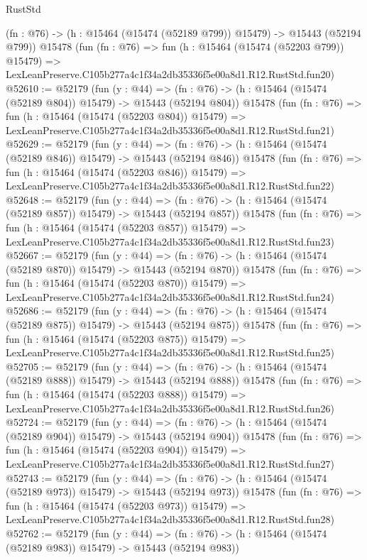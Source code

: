 \begin{lexlean}{RustStd}
\begin{coremodule}
    (fn : @76) -> (h : @15464 (@15474 (@52189 @799)) @15479) -> @15443 (@52194 @799))
    @15478
    (fun (fn : @76) =>
    fun (h : @15464 (@15474 (@52203 @799)) @15479) =>
    LexLeanPreserve.C105b277a4c1f34a2db35336f5e00a8d1.R12.RustStd.fun20)
@52610 := @52179
    (fun (y : @44) =>
    (fn : @76) -> (h : @15464 (@15474 (@52189 @804)) @15479) -> @15443 (@52194 @804))
    @15478
    (fun (fn : @76) =>
    fun (h : @15464 (@15474 (@52203 @804)) @15479) =>
    LexLeanPreserve.C105b277a4c1f34a2db35336f5e00a8d1.R12.RustStd.fun21)
@52629 := @52179
    (fun (y : @44) =>
    (fn : @76) -> (h : @15464 (@15474 (@52189 @846)) @15479) -> @15443 (@52194 @846))
    @15478
    (fun (fn : @76) =>
    fun (h : @15464 (@15474 (@52203 @846)) @15479) =>
    LexLeanPreserve.C105b277a4c1f34a2db35336f5e00a8d1.R12.RustStd.fun22)
@52648 := @52179
    (fun (y : @44) =>
    (fn : @76) -> (h : @15464 (@15474 (@52189 @857)) @15479) -> @15443 (@52194 @857))
    @15478
    (fun (fn : @76) =>
    fun (h : @15464 (@15474 (@52203 @857)) @15479) =>
    LexLeanPreserve.C105b277a4c1f34a2db35336f5e00a8d1.R12.RustStd.fun23)
@52667 := @52179
    (fun (y : @44) =>
    (fn : @76) -> (h : @15464 (@15474 (@52189 @870)) @15479) -> @15443 (@52194 @870))
    @15478
    (fun (fn : @76) =>
    fun (h : @15464 (@15474 (@52203 @870)) @15479) =>
    LexLeanPreserve.C105b277a4c1f34a2db35336f5e00a8d1.R12.RustStd.fun24)
@52686 := @52179
    (fun (y : @44) =>
    (fn : @76) -> (h : @15464 (@15474 (@52189 @875)) @15479) -> @15443 (@52194 @875))
    @15478
    (fun (fn : @76) =>
    fun (h : @15464 (@15474 (@52203 @875)) @15479) =>
    LexLeanPreserve.C105b277a4c1f34a2db35336f5e00a8d1.R12.RustStd.fun25)
@52705 := @52179
    (fun (y : @44) =>
    (fn : @76) -> (h : @15464 (@15474 (@52189 @888)) @15479) -> @15443 (@52194 @888))
    @15478
    (fun (fn : @76) =>
    fun (h : @15464 (@15474 (@52203 @888)) @15479) =>
    LexLeanPreserve.C105b277a4c1f34a2db35336f5e00a8d1.R12.RustStd.fun26)
@52724 := @52179
    (fun (y : @44) =>
    (fn : @76) -> (h : @15464 (@15474 (@52189 @904)) @15479) -> @15443 (@52194 @904))
    @15478
    (fun (fn : @76) =>
    fun (h : @15464 (@15474 (@52203 @904)) @15479) =>
    LexLeanPreserve.C105b277a4c1f34a2db35336f5e00a8d1.R12.RustStd.fun27)
@52743 := @52179
    (fun (y : @44) =>
    (fn : @76) -> (h : @15464 (@15474 (@52189 @973)) @15479) -> @15443 (@52194 @973))
    @15478
    (fun (fn : @76) =>
    fun (h : @15464 (@15474 (@52203 @973)) @15479) =>
    LexLeanPreserve.C105b277a4c1f34a2db35336f5e00a8d1.R12.RustStd.fun28)
@52762 := @52179
    (fun (y : @44) =>
    (fn : @76) -> (h : @15464 (@15474 (@52189 @983)) @15479) -> @15443 (@52194 @983))

\end{coremodule}
\end{lexlean}
